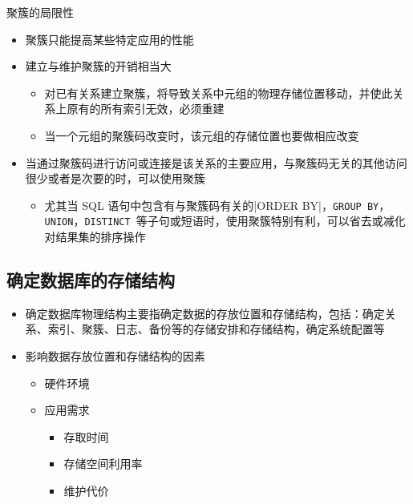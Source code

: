 聚簇的局限性
\begin{itemize}
    \item 聚簇只能提高某些特定应用的性能
    \item 建立与维护聚簇的开销相当大
    \begin{itemize}
        \item 对已有关系建立聚簇，将导致关系中元组的物理存储位置移动，并使此关系上原有的所有索引无效，必须重建
        \item 当一个元组的聚簇码改变时，该元组的存储位置也要做相应改变
    \end{itemize}
    \item 当通过聚簇码进行访问或连接是该关系的主要应用，与聚簇码无关的其他访问很少或者是次要的时，可以使用聚簇
    \begin{itemize}
        \item 尤其当 SQL 语句中包含有与聚簇码有关的\sverb|ORDER BY|，\verb|GROUP BY|，\verb|UNION|，\verb|DISTINCT|\ 等子句或短语时，使用聚簇特别有利，可以省去或减化对结果集的排序操作
    \end{itemize}
\end{itemize}

\subsection{确定数据库的存储结构}
\begin{itemize}
    \item 确定数据库物理结构主要指确定数据的存放位置和存储结构，包括：确定关系、索引、聚簇、日志、备份等的存储安排和存储结构，确定系统配置等
    \item 影响数据存放位置和存储结构的因素
    \begin{itemize}
        \item 硬件环境
        \item 应用需求
        \vspace{-0.8em}
        \begin{multicols}{3}
            \begin{itemize}
                \item 存取时间
                \item 存储空间利用率
                \item 维护代价
            \end{itemize}
        \end{multicols}
        \vspace{-1em}
    \end{itemize}
\end{itemize}

